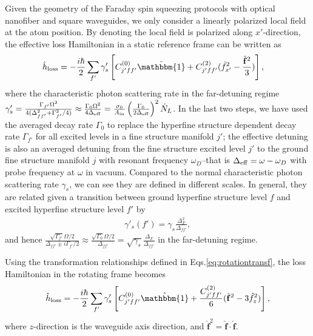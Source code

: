 \documentclass[pra,twocolumn,floatfix,superscriptaddress]{revtex4-1} %
\newcommand{\Ain}{A_{\rm in}}
\begin{document}
\begin{appendix}
Given the geometry of the Faraday spin squeezing protocols with optical nanofiber and square waveguides, we only consider a linearly polarized local field at the atom position. 
By denoting the local field is polarized along $ x'$-direction, the effective loss Hamiltonian in a static reference frame can be written as 
\begin{align}
\hat{h}_{\rm loss} &= -\frac{i\hbar}{2}\sum_{f'} \gamma'_s \left[C_{j'ff'}^{(0)}\hat{\mathbbm{1}}+C_{j'ff'}^{(2)}(\hat{f}_{x'}^2-\frac{\hat{\mathbf{f}}^2}{3} ) \right],
\end{align}
where the characteristic photon scattering rate in the far-detuning regime $ \gamma'_s=\frac{\Gamma_{f'}\Omega^2}{4(\Delta_{ff'}^2+\Gamma_{f'}^2/4 )} \approx \frac{\Gamma_0\Omega^2}{4\Delta_{\rm eff}}=\frac{\sigma_0}{\Ain}\left(\frac{\Gamma_0}{2\Delta_{\rm eff}} \right)^2\dot{N}_L $.
In the last two steps, we have used the averaged decay rate $ \Gamma_0 $ to replace the hyperfine structure dependent decay rate $ \Gamma_{f'} $ for all excited levels in a fine structure manifold $ j' $; the effective detuning is also an averaged detuning from the fine structure excited level $ j' $ to the ground fine structure manifold $ j $ with resonant frequency $ \omega_D $--that is $ \Delta_{\rm eff}=\omega -\omega_D $ with probe frequency at $ \omega $ in vacuum. 
Compared to the normal characteristic photon scattering rate $ \gamma_s $, we can see they are defined in different scales.
In general, they are related given a transition between ground hyperfine structure level $ f $ and excited hyperfine structure level $ f' $ by 
\begin{align}
\gamma'_s(f')=\gamma_s \frac{\Delta_F^2}{\Delta_{ff'}},
\end{align}
and hence $ \frac{\sqrt{\Gamma_{f'}}\Omega/2}{\Delta_{ff'}\pm i\Gamma_{f'}/2}\approx \frac{\sqrt{\Gamma_0}\Omega/2}{\Delta_{ff'}}=\sqrt{\gamma_s}\frac{\Delta_F}{\Delta_{ff'}} $ in the far-detuning regime.

Using the transformation relationships defined in Eqs.\eqref{eq:rotationtransf}, the loss Hamiltonian in the rotating frame becomes
\begin{subequations}\label{eq:rotationtransf_hloss}
\begin{align}
\hat{h}_{\rm loss} =-\frac{i\hbar}{2} \sum_{f'}\gamma'_s \left[C_{j'ff'}^{(0)}\hat{\mathbbm{1}} + \frac{C_{j'ff'}^{(2)}}{6}(\hat{\mathbf{f}}^2-3\hat{f}_z^2 ) \right],
\end{align}
\end{subequations}
where $ z $-direction is the waveguide axis direction, and $ \hat{\mathbf{f}}^2=\hat{\mathbf{f}}\cdot\hat{\mathbf{f}} $.


\end{appendix}
\end{document}
